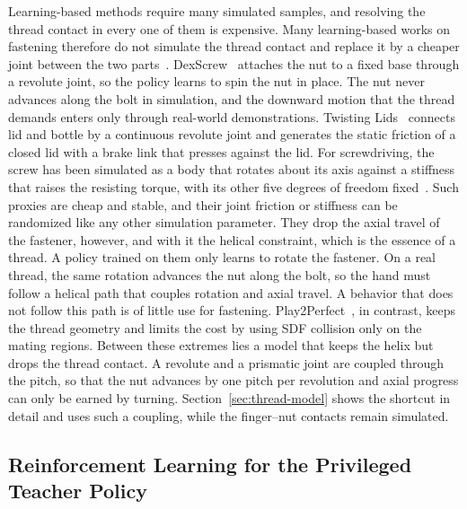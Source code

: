 Learning-based methods require many simulated samples, and resolving the thread contact in every one of them is expensive. Many learning-based works on fastening therefore do not simulate the thread contact and replace it by a cheaper joint between the two parts~\cite{Hsieh2026}. DexScrew~\cite{Hsieh2026} attaches the nut to a fixed base through a revolute joint, so the policy learns to spin the nut in place. The nut never advances along the bolt in simulation, and the downward motion that the thread demands enters only through real-world demonstrations. Twisting Lids~\cite{Lin2024} connects lid and bottle by a continuous revolute joint and generates the static friction of a closed lid with a brake link that presses against the lid. For screwdriving, the screw has been simulated as a body that rotates about its axis against a stiffness that raises the resisting torque, with its other five degrees of freedom fixed~\cite{Tang2024screwdriving}. Such proxies are cheap and stable, and their joint friction or stiffness can be randomized like any other simulation parameter. They drop the axial travel of the fastener, however, and with it the helical constraint, which is the essence of a thread. A policy trained on them only learns to rotate the fastener. On a real thread, the same rotation advances the nut along the bolt, so the hand must follow a helical path that couples rotation and axial travel. A behavior that does not follow this path is of little use for fastening. Play2Perfect~\cite{Lum2026}, in contrast, keeps the thread geometry and limits the cost by using SDF collision only on the mating regions. Between these extremes lies a model that keeps the helix but drops the thread contact. A revolute and a prismatic joint are coupled through the pitch, so that the nut advances by one pitch per revolution and axial progress can only be earned by turning. Section~\ref{sec:thread-model} shows the shortcut in detail and uses such a coupling, while the finger--nut contacts remain simulated.

\subsection{Reinforcement Learning for the Privileged Teacher Policy}\label{sec:rl-background}


